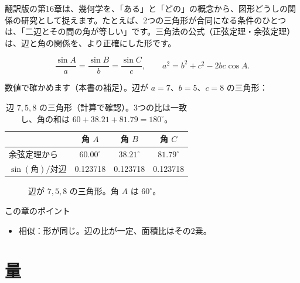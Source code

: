 \documentclass[a4paper,11pt,openany]{ltjsbook}
\begin{document}
翻訳版の第16章は、幾何学を、「ある」と「どの」の概念から、図形どうしの関係の研究として捉えます。たとえば、2つの三角形が合同になる条件のひとつは、「二辺とその間の角が等しい」です。三角法の公式（正弦定理・余弦定理）は、辺と角の関係を、より正確にした形です。

\[
\frac{\sin A}{a}=\frac{\sin B}{b}=\frac{\sin C}{c},\qquad a^2=b^2+c^2-2bc\cos A.
\]

数値で確かめます（本書の補足）。辺が $a=7$、$b=5$、$c=8$ の三角形：

\begin{table}[htbp]
\centering
\begin{tabular}{lccc}
\toprule
 & 角 $A$ & 角 $B$ & 角 $C$\\
\midrule
余弦定理から & $60.00^\circ$ & $38.21^\circ$ & $81.79^\circ$\\
$\sin(\text{角})/\text{対辺}$ & 0.123718 & 0.123718 & 0.123718\\
\bottomrule
\end{tabular}
\caption{辺 $7,5,8$ の三角形（計算で確認）。3つの比は一致し、角の和は $60+38.21+81.79=180^\circ$。}
\end{table}

\begin{figure}[htbp]
\centering
{}
\caption{辺が $7,5,8$ の三角形。角 $A$ は $60^\circ$。}
\end{figure}

\begin{pointbox}{この章のポイント}
\begin{itemize}[leftmargin=1.5em]
\item 相似：形が同じ。辺の比が一定、面積比はその2乗。
\end{itemize}
\end{pointbox}

\chapter{量}
\end{document}
